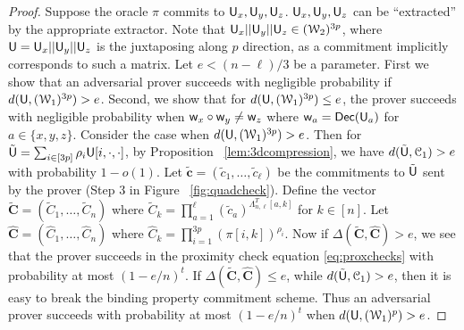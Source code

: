 \begin{proof}
	Suppose the oracle $\pi$ commits to $\mathsf{U}_x, \mathsf{U}_y, \mathsf{U}_z$. $\mathsf{U}_x, \mathsf{U}_y, \mathsf{U}_z$ can be ``extracted'' by the appropriate extractor. Note that $\mathsf{U}_x||\mathsf{U}_y||\mathsf{U}_z\in (\mathcal{W}_2)^{3p}$, where $\mathsf{U} = \mathsf{U}_x||\mathsf{U}_y||\mathsf{U}_z$ is the juxtaposing along $p$ direction, as a commitment implicitly corresponds to such a matrix. Let $e<(n-\ell)/3$ be a parameter. 
	First we show that an adversarial prover succeeds with negligible probability if $d(\mathsf{U},(\mathcal{W}_1)^{3p})>e$. 
	Second, we show that for $d(\mathsf{U},(\mathcal{W}_1)^{3p})\leq e$, the prover succeeds with negligible probability when	$\mathsf{w}_x\circ\mathsf{w}_y\neq\mathsf{w}_z$ where $\mathsf{w}_a=\mathsf{Dec}(\mathsf{U}_a)$ for $a\in\{x,y,z\}$. Consider the case when $d(\mathsf{U},(\mathcal{W}_1)^{3p})>e$. Then for $\tilde{\mathsf{U}}=\sum_{i\in [3p]}\rho_i\mathsf{U}[i,\cdot,\cdot]$, by Proposition ~\ref{lem:3dcompression},
	we have $d(\tilde{\mathsf{U}},\mathcal{C}_1)>e$ with probability $1-o(1)$. Let $\tilde{\bm{c}}=(\tilde{c}_1, \ldots,\tilde{c}_\ell)$ be the commitments to $\tilde{\mathsf{U}}$ sent by the prover
	(Step 3 in Figure ~\ref{fig:quadcheck}). Define the vector $\tilde{\bm{C}}=(\tilde{C}_1,\ldots,\tilde{C}_n)$ where $\tilde{C}_k=\prod_{a=1}^\ell (\tilde{c}_a)^{\Lambda_{n,\ell}^T[a,k]}$ for $k\in [n]$.
	Let $\hat{\bm{C}}=(\hat{C}_1,\ldots,\hat{C}_n)$ where $\hat{C}_k=\prod_{i=1}^{3p}(\pi[i,k])^{\rho_i}$. Now if $\Delta(\tilde{\bm{C}},\hat{\bm{C}})>e$, we see that the prover succeeds in the	proximity check equation \eqref{eq:proxchecks} with probability at most $(1-e/n)^t$.
	If $\Delta(\tilde{\bm{C}}, \hat{\bm{C}}) \leq e$, while $d(\tilde{\mathsf{U}},\mathcal{C}_1)>e$, then it is easy to break the binding property commitment scheme. Thus an adversarial prover succeeds with probability at most $(1-e/n)^t$ when $d(\mathsf{U},(\mathcal{W}_1)^p)>e$.
	

\end{proof}
